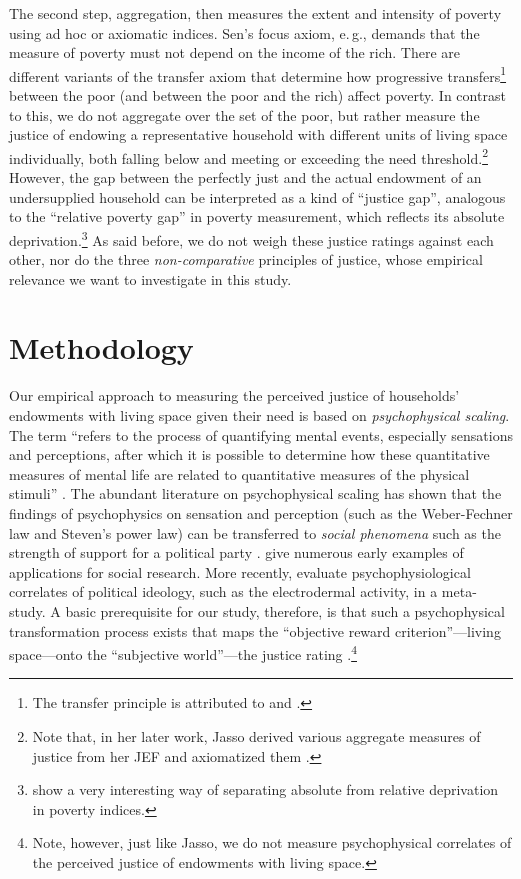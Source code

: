 \documentclass[12pt]{scrartcl}
\begin{document}
The second step, aggregation, then measures the extent and intensity of poverty using ad hoc or axiomatic indices.
Sen's \citeyearpar{sen_poverty_1976} focus axiom, e.\,g., demands that the measure of poverty must not depend on the income of the rich.
There are different variants of the transfer axiom that determine how progressive transfers\footnote{The transfer principle is attributed to \citet{pigou_wealth_1912} and \citet{dalton_measurement_1920}.} between the poor (and between the poor and the rich) affect poverty.
In contrast to this, we do not aggregate over the set of the poor, but rather measure the justice of endowing a representative household with different units of living space individually, both falling below and meeting or exceeding the need threshold.\footnote{Note that, in her later work, Jasso derived various aggregate measures of justice from her JEF and axiomatized them \citep[see, e.\,g.,][]{jasso_how_1999}.}
However, the gap between the perfectly just and the actual endowment of an undersupplied household can be interpreted as a kind of ``justice gap'', analogous to the ``relative poverty gap'' in poverty measurement, which reflects its absolute deprivation.\footnote{\citet{duclos_absolute_2002} show a very interesting way of separating absolute from relative deprivation in poverty indices.}
As said before, we do not weigh these justice ratings against each other, nor do the three \textit{non-comparative} principles of justice, whose empirical relevance we want to investigate in this study.


\section{Methodology}\label{sec:methodology}
Our empirical approach to measuring the perceived justice of households' endowments with living space given their need is based on \textit{psychophysical scaling}.
The term ``refers to the process of quantifying mental events, especially sensations and perceptions, after which it is possible to determine how these quantitative measures of mental life are related to quantitative measures of the physical stimuli'' \citep[p.~91]{marks_psychophysical_2002}.
The abundant literature on psychophysical scaling has shown that the findings of psychophysics on sensation and perception (such as the Weber-Fechner law and Steven's power law) can be transferred to \textit{social phenomena} such as the strength of support for a political party \cite[see, e.\,g.,][]{stevens_psychophysics_1986}.
\citet[pp.~617--618]{lodge_psychophysical_1975} give numerous early examples of applications for social research.
More recently, \citet{osmundsen_psychophysiology_2022} evaluate psychophysiological correlates of political ideology, such as the electrodermal activity, in a meta-study.
A basic prerequisite for our study, therefore, is that such a psychophysical transformation process exists that maps the ``objective reward criterion''---living space---onto the ``subjective world''---the justice rating \citep[p.~412]{jasso_methods_1997}.\footnote{Note, however, just like Jasso, we do not measure psychophysical correlates of the perceived justice of endowments with living space.}
\end{document}
